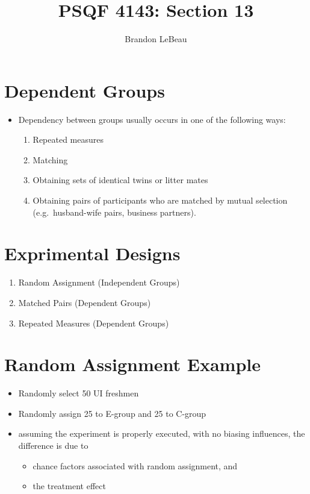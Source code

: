\documentclass[12pt]{article}
\title{PSQF 4143: Section 13}
\author{Brandon LeBeau}
\date{}
\begin{document}
\maketitle

\section{Dependent Groups}\label{dependent-groups}

\begin{itemize}
\itemsep1pt\parskip0pt
\item
  Dependency between groups usually occurs in one of the following ways:

  \begin{enumerate}
  \def\labelenumi{\arabic{enumi}.}
  \itemsep1pt\parskip0pt
  \item
    Repeated measures
  \item
    Matching
  \item
    Obtaining sets of identical twins or litter mates
  \item
    Obtaining pairs of participants who are matched by mutual selection
    (e.g.~husband-wife pairs, business partners).
  \end{enumerate}
\end{itemize}

\section{Exprimental Designs}\label{exprimental-designs}

\begin{enumerate}
\def\labelenumi{\arabic{enumi}.}
\itemsep1pt\parskip0pt
\item
  Random Assignment (Independent Groups)
\item
  Matched Pairs (Dependent Groups)
\item
  Repeated Measures (Dependent Groups)
\end{enumerate}

\section{Random Assignment Example}\label{random-assignment-example}

\begin{itemize}
\itemsep1pt\parskip0pt
\item
  Randomly select 50 UI freshmen
\item
  Randomly assign 25 to E-group and 25 to C-group
\item
  assuming the experiment is properly executed, with no biasing
  influences, the difference is due to

  \begin{itemize}
  \itemsep1pt\parskip0pt
  \item
    chance factors associated with random assignment, and
  \item
    the treatment effect
  \end{itemize}
\end{itemize}
\end{document}
